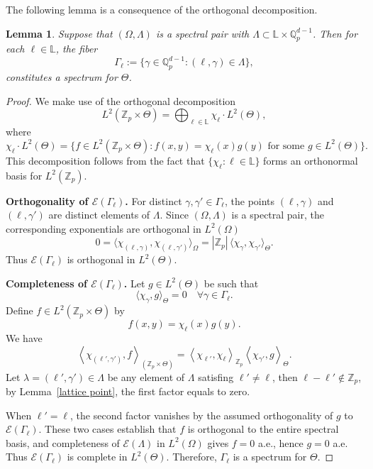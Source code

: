 \documentclass[a4paper,12pt]{amsart}
\newtheorem{lemma}[theorem]{Lemma}
\def\Q{\mathbb{Q}}
\begin{document}
The following lemma is a consequence of the orthogonal decomposition.
\begin{lemma}\label{lembasespectrum}
 Suppose that $(\Omega,\Lambda)$ is a spectral pair with $\Lambda\subset\mathbb{L}\times\Q_p^{d-1}$.
Then for each $\ell\in\mathbb{L}$, the fiber
\begin{equation}\label{equ-base spectrum}
\Gamma_\ell:=\Big\{\gamma\in\Q_p^{d-1}:(\ell, \gamma)\in\Lambda \Big\},
\end{equation}
constitutes a spectrum for $\Theta$.
\end{lemma}

\begin{proof}
We make use of the orthogonal decomposition
\[
L^2(\mathbb{Z}_p\times\Theta)=\bigoplus_{\ell\in\mathbb{L}}\chi_\ell \cdot L^2(\Theta),
\]
where
 \[
\chi_\ell \cdot L^2(\Theta)=\{f\in L^2(\mathbb{Z}_p\times\Theta): f(x,y)=\chi_\ell(x)g(y)\text{ for some }g\in L^2(\Theta)\}.
\]
This decomposition follows from the fact that $\{\chi_\ell:\ell\in\mathbb{L}\}$ forms an orthonormal basis for $L^2(\mathbb{Z}_p)$.

\textbf{Orthogonality of $\mathcal{E}(\Gamma_\ell)$.} For distinct $\gamma,\gamma'\in\Gamma_\ell$,
the points $(\ell,\gamma)$ and $(\ell,\gamma')$ are distinct elements of $\Lambda$. Since $(\Omega,\Lambda)$
is a spectral pair, the corresponding exponentials are orthogonal in $L^2(\Omega)$
\[
0=\langle \chi_{(\ell,\gamma)},\chi_{(\ell,\gamma')}\rangle_\Omega
=|\mathbb{Z}_p|\,\langle \chi_\gamma,\chi_{\gamma'}\rangle_\Theta.
\]
Thus $\mathcal{E}(\Gamma_\ell)$ is orthogonal in $L^2(\Theta)$.

\textbf{Completeness of $\mathcal{E}(\Gamma_\ell)$.} Let $g\in L^2(\Theta)$ be such that
\[
\langle \chi_\gamma,g\rangle_\Theta=0\quad \forall \gamma\in\Gamma_\ell.
\]
Define $f\in L^2(\mathbb{Z}_p\times\Theta)$ by
\[
f(x,y)=\chi_\ell(x)g(y).
\]
We have
\[
\left\langle
\chi_{(\ell',\gamma')},f
\right\rangle_{(\mathbb Z_p\times\Theta)}
=
\left\langle
\chi_{\ell'},\chi_\ell
\right\rangle_{\mathbb Z_p}
\left\langle
\chi_{\gamma'},g
\right\rangle_{\Theta}.
\]
Let $\lambda=(\ell',\gamma')\in\Lambda$ be any element of $\Lambda$ satisfing \(\ell'\ne\ell\),
then $\ell-\ell'\notin\mathbb{Z}_p$, by Lemma~\ref{lattice point}, the first factor equals to zero.

When \(\ell'=\ell\), the second factor vanishes by the assumed orthogonality of \(g\) to \(\mathcal{E}(\Gamma_\ell)\).
These two cases establish that \(f\) is orthogonal to the entire spectral basis,
and completeness of $\mathcal{E}(\Lambda)$ in $L^2(\Omega)$ gives \(f=0\) a.e., hence \(g=0\) a.e.
Thus $\mathcal{E}(\Gamma_\ell)$ is complete in $L^2(\Theta)$. Therefore, $\Gamma_\ell$ is a spectrum for $\Theta$.
\end{proof}
\end{document}
